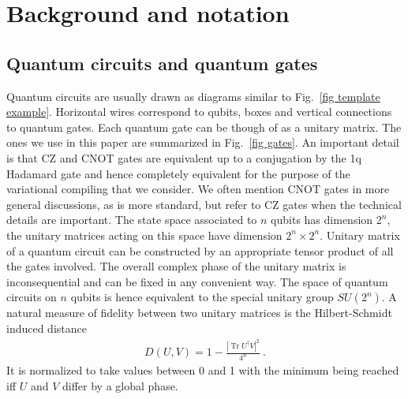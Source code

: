 \documentclass[draft, twocolumn, amsfonts, amssymb, aps, nofootinbib]{revtex4-2}
\newcommand{\CZ}{\textsf{CZ }}
\newcommand{\CX}{\textsf{CNOT }}
\begin{document}
\section{Background and notation \label{sec gates}}
\subsection{Quantum circuits and quantum gates}
Quantum circuits are usually drawn as diagrams similar to Fig.~\ref{fig template example}. Horizontal wires correspond to qubits, boxes and vertical connections to quantum gates. Each quantum gate can be though of as a unitary matrix. The ones we use in this paper are summarized in Fig.~\ref{fig gates}. An important detail is that \CZ and \CX gates are equivalent up to a conjugation by the 1q Hadamard gate and hence completely equivalent for the purpose of the variational compiling that we consider. We often mention \CX gates in more general discussions, as is more standard, but refer to \CZ gates when the technical details are important.
The state space associated to $n$ qubits has dimension $2^n$, the unitary matrices acting on this space have dimension $2^n\times 2^n$. Unitary matrix of a quantum circuit can be constructed by an appropriate tensor product of all the gates involved. The overall complex phase of the unitary matrix is inconsequential and can be fixed in any convenient way. The space of quantum circuits on $n$ qubits is hence equivalent to the special unitary group $SU(2^n)$. A natural measure of fidelity between two unitary matrices is the Hilbert-Schmidt induced distance
\begin{align}
D(U, V)=1-\frac{|\operatorname{Tr}U^\dagger V|^2}{4^n} \ . \label{D hst}
\end{align}
It is normalized to take values between 0 and 1 with the minimum being reached iff $U$ and $V$ differ by a global phase.
\end{document}
